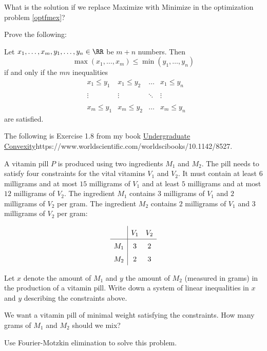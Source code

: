 \documentclass{article}
\begin{document}
\beginshex
What is the solution if we replace Maximize with Minimize in the optimization problem \eqref{optfmex}?
\endshex

  

\beginshex\label{explex}

Prove the following:

    Let $x_1, \dots, x_m, y_1, \dots, y_n\in \RR$ be $m + n$ numbers. Then
    $$
    \max(x_1, \dots, x_m) \leq \min(y_1, \dots, y_n)
    $$
    if and only if the $m n$ inequalities
    $$
    \begin{matrix}
      &x_1 \leq y_1 &x_1 \leq y_2 &\dots &x_1\leq y_n\\
      \\
      &\vdots & \vdots &\ddots &\vdots\\
      \\
      &x_m \leq y_1 &x_m \leq y_2 &\dots &x_m\leq y_n
    \end{matrix}
    $$
    are satisfied.
\endshex

\beginshex

The following is Exercise 1.8 from my book \url{Undergraduate Convexity}{https://www.worldscientific.com/worldscibooks/10.1142/8527}.

A vitamin pill $P$ is produced using two ingredients $M_1$
  and $M_2$. The pill needs to satisfy four constraints for the vital
  vitamins $V_1$ and $V_2$. It must contain at least $6$ milligrams and
  at most $15$ milligrams of $V_1$ and at least $5$ milligrams and at
  most $12$ milligrams of $V_2$. The ingredient $M_1$ contains $3$
  milligrams of $V_1$ and $2$ milligrams of $V_2$ per gram.  The
  ingredient $M_2$ contains $2$ milligrams of $V_1$ and $3$ milligrams
  of $V_2$ per gram:

$$
\def\arraystretch{1.5}
\begin{array}{c|cc}
& V_1 & V_2\\ \hline
M_1 & 3 & 2\\
M_2 & 2 & 3
\end{array}
$$


Let $x$ denote the amount of $M_1$ and $y$ the amount of $M_2$
  (measured in grams) in the production of a vitamin pill. Write down
  a system of linear inequalities in $x$ and $y$ describing the
  constraints above.

  We want a vitamin pill of minimal weight satisfying the
  constraints. How many grams of $M_1$ and $M_2$ should we mix?
  
Use Fourier-Motzkin elimination to solve this
  problem.
\end{document}
